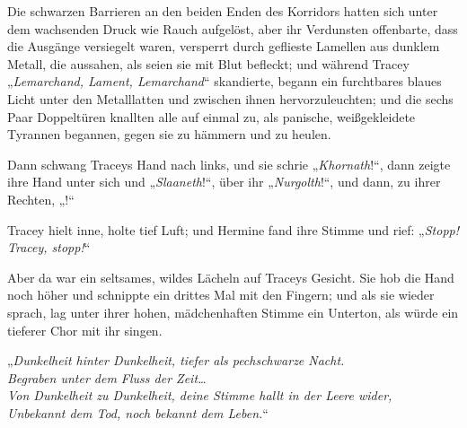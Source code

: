 Die schwarzen Barrieren an den beiden Enden des Korridors hatten sich unter dem wachsenden Druck wie Rauch aufgelöst, aber ihr Verdunsten offenbarte, dass die Ausgänge versiegelt waren, versperrt durch geflieste Lamellen aus dunklem Metall, die aussahen, als seien sie mit Blut befleckt; und während Tracey „\emph{Lemarchand, Lament, Lemarchand}“ skandierte, begann ein furchtbares blaues Licht unter den Metalllatten und zwischen ihnen hervorzuleuchten; und die sechs Paar Doppeltüren knallten alle auf einmal zu, als panische, weißgekleidete Tyrannen begannen, gegen sie zu hämmern und zu heulen.

Dann schwang Traceys Hand nach links, und sie schrie „\emph{Khornath}!“, dann zeigte ihre Hand unter sich und „\emph{Slaaneth}!“, über ihr „\emph{Nurgolth}!“, und dann, zu ihrer Rechten, „!“

Tracey hielt inne, holte tief Luft; und Hermine fand ihre Stimme und rief: „\emph{Stopp! Tracey, stopp!}“

Aber da war ein seltsames, wildes Lächeln auf Traceys Gesicht. Sie hob die Hand noch höher und schnippte ein drittes Mal mit den Fingern; und als sie wieder sprach, lag unter ihrer hohen, mädchenhaften Stimme ein Unterton, als würde ein tieferer Chor mit ihr singen.

„\emph{Dunkelheit hinter Dunkelheit, tiefer als pechschwarze Nacht.\\
Begraben unter dem Fluss der Zeit…\\
Von Dunkelheit zu Dunkelheit, deine Stimme hallt in der Leere wider,\\
Unbekannt dem Tod, noch bekannt dem Leben.}“

